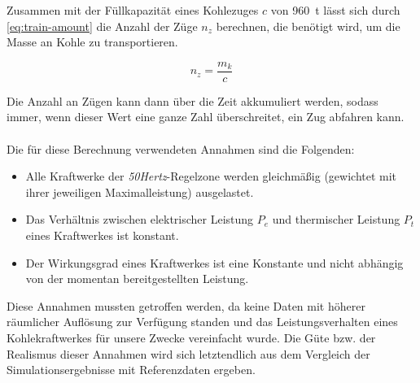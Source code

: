 Zusammen mit der Füllkapazität eines Kohlezuges $c$ von 960~t lässt sich durch \autoref{eq:train-amount} die Anzahl der Züge $n_z$ berechnen, die benötigt wird, um die Masse an Kohle zu transportieren.

\begin{equation}
    n_z=\frac{m_k}{c}\label{eq:train-amount}
\end{equation}

Die Anzahl an Zügen kann dann über die Zeit akkumuliert werden, sodass immer, wenn dieser Wert eine ganze Zahl überschreitet, ein Zug abfahren kann.\\
\\
Die für diese Berechnung verwendeten Annahmen sind die Folgenden:
\begin{itemize}
    \item Alle Kraftwerke der \emph{50Hertz}-Regelzone werden gleichmäßig (gewichtet mit ihrer jeweiligen Maximalleistung) ausgelastet.
    \item Das Verhältnis zwischen elektrischer Leistung $P_e$ und thermischer Leistung $P_t$ eines Kraftwerkes ist konstant.
    \item Der Wirkungsgrad eines Kraftwerkes ist eine Konstante und nicht abhängig von der momentan bereitgestellten Leistung.
\end{itemize}
Diese Annahmen mussten getroffen werden, da keine Daten mit höherer räumlicher Auflösung zur Verfügung standen und das Leistungsverhalten eines Kohlekraftwerkes für unsere Zwecke vereinfacht wurde. Die Güte bzw. der Realismus dieser Annahmen wird sich letztendlich aus dem Vergleich der Simulationsergebnisse mit Referenzdaten ergeben.
